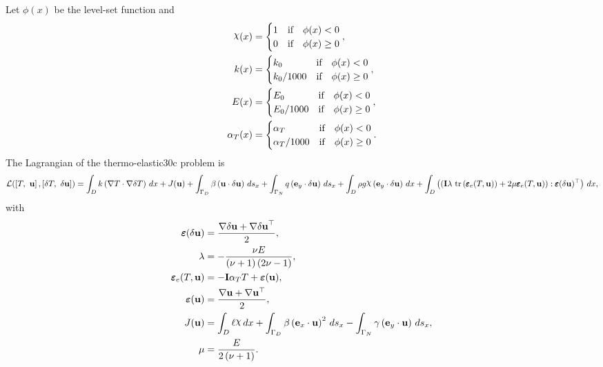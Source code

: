 \documentclass[preview]{standalone}
\let\oldcdot\cdot
\let\cdot\oldcdot
\begin{document}
Let $\phi(x)$ be the level-set function and
 \begin{align*}\raisebox{\depth}{$\chi$}(x) &= \begin{cases} 1 & \mbox{if}\quad \phi(x) < 0 \\ 0 & \mbox{if}\quad \phi(x)  \ge 0 \end{cases},\\
k(x) &= \begin{cases} k_0 & \mbox{if}\quad \phi(x) < 0 \\ k_0/1000 & \mbox{if}\quad \phi(x)  \ge 0 \end{cases},\\
E(x) &= \begin{cases} E_0 & \mbox{if}\quad \phi(x) < 0 \\ E_0/1000 & \mbox{if}\quad \phi(x)  \ge 0 \end{cases},\\
\alpha_{T}(x) &= \begin{cases} \alpha_T & \mbox{if}\quad \phi(x) < 0 \\ \alpha_T/1000 & \mbox{if}\quad \phi(x)  \ge 0 \end{cases}.\end{align*}
The Lagrangian of the thermo-elastic30c problem is
\begin{dmath*}
\mathcal L(\left[ T, \  {\mathbf{ u }}\right],\left[ \delta T, \  {\delta\mathbf{  u }}\right]) =  \int_{D} k \left(  \nabla T  \cdot  \nabla \delta T  \right) \,dx + J({\mathbf{ u }}) +  \int_{\Gamma_D} \beta \left( {\mathbf{ u }} \cdot {\delta\mathbf{  u }} \right) \,ds_x +  \int_{\Gamma_N} q \left( \mathbf e_y \cdot {\delta\mathbf{  u }} \right) \,ds_x +  \int_{D} \rho g \raisebox{\depth}{$\chi$} \left( \mathbf e_y \cdot {\delta\mathbf{  u }} \right) \,dx +  \int_{D} \left( \left( \mathbf{I} \lambda  \,\operatorname{tr}\left(\pmb\varepsilon_{e}(T,{\mathbf{ u }})\right)  + 2 \mu \pmb\varepsilon_{e}(T,{\mathbf{ u }}) \right) \mathrel{:}  \pmb\varepsilon({\delta\mathbf{  u }})^\top  \right) \,dx , 
\end{dmath*}
with 
\begin{align*}
\pmb\varepsilon({\delta\mathbf{  u }}) &= \frac{ \nabla {\delta\mathbf{  u }}  +   \nabla {\delta\mathbf{  u }} ^\top }{2},\\
\lambda &= - \frac{\nu E}{\left(\nu + 1\right) \left(2 \nu - 1\right)},\\
\pmb\varepsilon_{e}(T,{\mathbf{ u }}) &= - \mathbf{I} \alpha_{T} T + \bm\varepsilon({\mathbf{ u }}),\\
\bm\varepsilon({\mathbf{ u }}) &= \frac{ \nabla {\mathbf{ u }}  +   \nabla {\mathbf{ u }} ^\top }{2},\\
J({\mathbf{ u }}) &=  \int_{D} \ell \raisebox{\depth}{$\chi$} \,dx +  \int_{\Gamma_D} \beta \left( \mathbf e_x \cdot {\mathbf{ u }} \right)^{2} \,ds_x -  \int_{\Gamma_N} \gamma \left( \mathbf e_y \cdot {\mathbf{ u }} \right) \,ds_x,\\
\mu &= \frac{E}{2 \left(\nu + 1\right)}.
 \end{align*}
\end{document}
